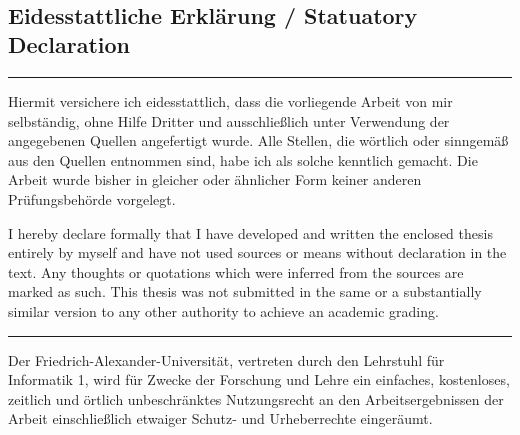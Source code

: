 \documentclass[10pt,twoside,a4paper,bibliography=totoc]{scrbook}
\begin{document}

%
%


\chapter*{\ }


\vspace*{\fill}


\begin{Large}
\chapter{Eidesstattliche Erklärung / Statuatory Declaration}
\end{Large}
\vspace{1.5em}


\noindent\hrule

Hiermit versichere ich eidesstattlich, dass die vorliegende Arbeit von mir
selbständig, ohne Hilfe Dritter und ausschließlich unter Verwendung der
angegebenen Quellen angefertigt wurde. Alle Stellen, die wörtlich oder
sinngemäß aus den Quellen entnommen sind, habe ich als solche kennt\-lich
gemacht. Die Arbeit wurde bisher in gleicher oder ähnlicher Form keiner anderen
Prüfungsbehörde vorgelegt. 
\vspace{1.5em}


I hereby declare formally that I have developed and written the enclosed thesis
entirely by myself and have not used sources or means without declaration in
the text. Any thoughts or quotations which were inferred from the sources are
marked as such. This thesis was not submitted in the same or a substantially
similar version to any other authority to achieve an academic grading. 

\noindent\hrule

\vspace{2em}


Der Friedrich-Alexander-Universität, vertreten durch den Lehrstuhl
für Informatik 1, wird für Zwecke der Forschung und Lehre ein
einfaches, kostenloses, zeitlich und örtlich unbeschränktes
Nutzungsrecht an den Arbeitsergebnissen der Arbeit einschließlich
etwaiger Schutz- und Urheberrechte eingeräumt.
\end{document}
